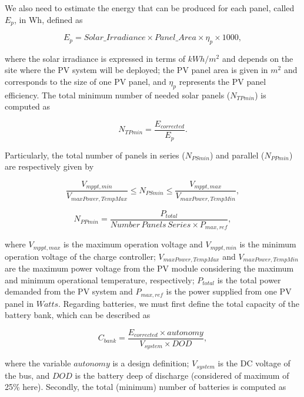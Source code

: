 \documentclass[review]{elsarticle}
\begin{document}
%
We also need to estimate the energy that can be produced for each panel, called $E_{p}$, in Wh, defined as
%

\begin{equation}
\label{eq:Ep}
E_{p} = Solar\_Irradiance \times Panel\_Area \times \eta_{p} \times 1000,
\end{equation}

\noindent where the solar irradiance is expressed in terms of $kWh/m^{2}$ and depends on the site where the PV system will be deployed; 
the PV panel area is given in $m^{2}$ and corresponds to the size of one PV panel, and $\eta_{p}$ represents the PV panel efficiency.
%
The total minimum number of needed solar panels ($N_{TPmin}$) is computed as

\begin{equation}
\label{eq:NTPmin}
N_{TPmin} = \dfrac{E_{corrected}}{E_{p}}.
\end{equation}

Particularly, the total number of panels in series ($N_{PSmin}$) and parallel ($N_{PPmin}$) are respectively given by

\begin{equation}
\label{eq:NPSmin}
\dfrac{V_{mppt,min}}{V_{maxPower,TempMax}} \leq N_{PSmin} \leq \dfrac{V_{mppt,max}}{V_{maxPower,TempMin}},
\end{equation}

\begin{equation}
\label{eq:NPPmin}
N_{PPmin} = \dfrac{P_{total}}{Number\,Panels\,Series \times P_{max,ref}},
\end{equation}

\noindent where $V_{mppt,max}$ is the maximum operation voltage and $V_{mppt,min}$ is the minimum operation voltage of the charge controller; $V_{maxPower,TempMax}$ and $V_{maxPower,TempMin}$ are the maximum power voltage from the PV module considering the maximum and minimum operational temperature, respectively; $P_{total}$ is the total power demanded from the PV system and $P_{max,ref}$ is the power supplied from one PV panel in $Watts$.
%
Regarding batteries, we must first define the total capacity of the battery bank, which can be described as

\begin{equation}
\label{eq:Cbank}
C_{bank} = \dfrac{E_{corrected} \times autonomy}{V_{system} \times DOD},
\end{equation}

\noindent where the variable $autonomy$ is a design definition; %
$ V_{system} $ is the DC voltage of the bus, and $ DOD $ is the battery deep of discharge (considered of maximum of 25\% here).
%
Secondly, the total (minimum) number of batteries is computed as 
\end{document}
